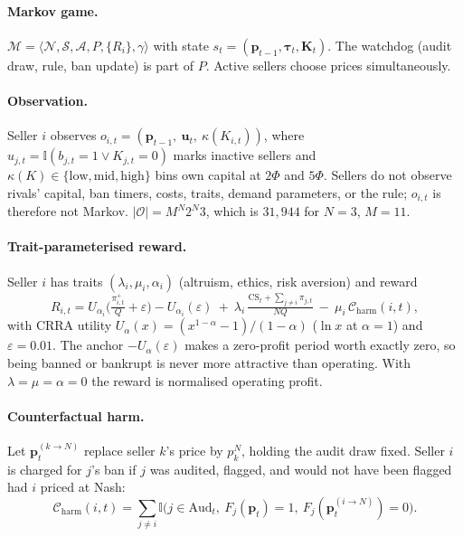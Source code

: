 \documentclass{article}
\newcommand{\Charm}{\mathcal{C}_{\mathrm{harm}}}
\begin{document}
\paragraph{Markov game.} $\mathcal{M}=\langle\mathcal N,\mathcal S,\mathcal A,P,\{R_i\},\gamma\rangle$ with state $s_t=(\mathbf p_{t-1},\boldsymbol\tau_t,\mathbf K_t)$. The watchdog (audit draw, rule, ban update) is part of $P$. Active sellers choose prices simultaneously.

\paragraph{Observation.} Seller $i$ observes $o_{i,t}=(\mathbf p_{t-1},\ \mathbf u_t,\ \kappa(K_{i,t}))$, where $u_{j,t}=\mathbb I(b_{j,t}=1\lor K_{j,t}=0)$ marks inactive sellers and $\kappa(K)\in\{\text{low},\text{mid},\text{high}\}$ bins own capital at $2\Phi$ and $5\Phi$. Sellers do not observe rivals' capital, ban timers, costs, traits, demand parameters, or the rule; $o_{i,t}$ is therefore not Markov. $|\mathcal O|=M^N2^N3$, which is $31{,}944$ for $N=3$, $M=11$.

\paragraph{Trait-parameterised reward.} Seller $i$ has traits $(\lambda_i,\mu_i,\alpha_i)$ (altruism, ethics, risk aversion) and reward
\begin{equation}
R_{i,t}=U_{\alpha_i}\!\Big(\tfrac{\pi_{i,t}^+}{Q}+\varepsilon\Big)-U_{\alpha_i}(\varepsilon)\ +\ \lambda_i\,\tfrac{\mathrm{CS}_t+\sum_{j\ne i}\pi_{j,t}}{NQ}\ -\ \mu_i\,\Charm(i,t),
\end{equation}
with CRRA utility $U_\alpha(x)=(x^{1-\alpha}-1)/(1-\alpha)$ ($\ln x$ at $\alpha=1$) and $\varepsilon=0.01$. The anchor $-U_\alpha(\varepsilon)$ makes a zero-profit period worth exactly zero, so being banned or bankrupt is never more attractive than operating. With $\lambda=\mu=\alpha=0$ the reward is normalised operating profit.

\paragraph{Counterfactual harm.} Let $\mathbf p_t^{(k\to N)}$ replace seller $k$'s price by $p^N_k$, holding the audit draw fixed. Seller $i$ is charged for $j$'s ban if $j$ was audited, flagged, and would not have been flagged had $i$ priced at Nash:
\begin{equation}
\Charm(i,t)=\textstyle\sum_{j\ne i}\mathbb I\big(j\in\mathrm{Aud}_t,\ F_j(\mathbf p_t)=1,\ F_j(\mathbf p_t^{(i\to N)})=0\big).
\end{equation}
\end{document}
